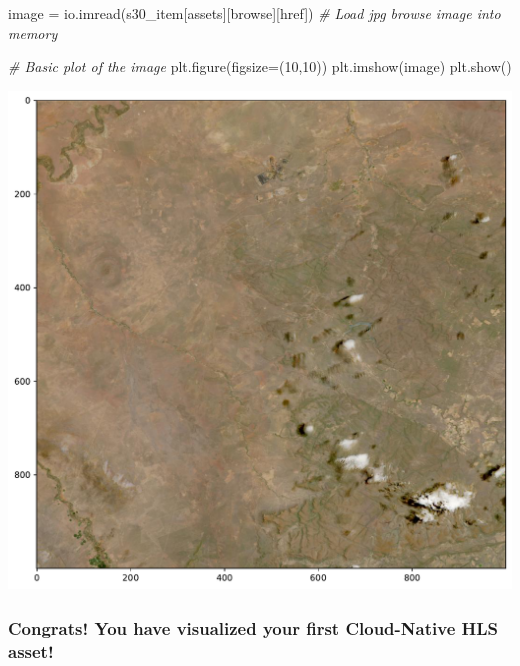 \documentclass[
  letterpaper,
]{scrartcl}
\newenvironment{Shaded}{}{}
\newcommand{\CommentTok}[1]{\textcolor[rgb]{0.38,0.63,0.69}{\textit{#1}}}
\newcommand{\DecValTok}[1]{\textcolor[rgb]{0.25,0.63,0.44}{#1}}
\newcommand{\NormalTok}[1]{#1}
\newcommand{\OperatorTok}[1]{\textcolor[rgb]{0.40,0.40,0.40}{#1}}
\newcommand{\StringTok}[1]{\textcolor[rgb]{0.25,0.44,0.63}{#1}}
\begin{document}
\begin{Shaded}
\begin{Highlighting}[]
\NormalTok{image }\OperatorTok{=}\NormalTok{ io.imread(s30\_item[}\StringTok{\textquotesingle{}assets\textquotesingle{}}\NormalTok{][}\StringTok{\textquotesingle{}browse\textquotesingle{}}\NormalTok{][}\StringTok{\textquotesingle{}href\textquotesingle{}}\NormalTok{])  }\CommentTok{\# Load jpg browse image into memory}

\CommentTok{\# Basic plot of the image}
\NormalTok{plt.figure(figsize}\OperatorTok{=}\NormalTok{(}\DecValTok{10}\NormalTok{,}\DecValTok{10}\NormalTok{))              }
\NormalTok{plt.imshow(image)}
\NormalTok{plt.show()}
\end{Highlighting}
\end{Shaded}

\includegraphics{Navigate_CMR_STAC_files/figure-pdf/cell-21-output-1.pdf}

\hypertarget{congrats-you-have-visualized-your-first-cloud-native-hls-asset}{%
\subsubsection{Congrats! You have visualized your first Cloud-Native HLS
asset!}\label{congrats-you-have-visualized-your-first-cloud-native-hls-asset}}
\end{document}
